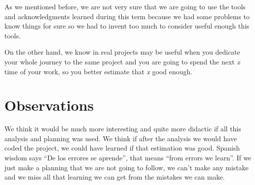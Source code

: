 \documentclass{report}
\begin{document}
As we mentioned before, we are not very sure that we are going to use the tools and acknowledgments learned during this term because we had some problems to know things for sure so we had to invent too much to consider useful enough this tools.

On the other hand, we know in real projects may be useful when you dedicate your whole journey to the same project and you are going to spend the next \emph{x} time of your work, so you better estimate that \emph{x} good enough.

\section{Observations}

We think it would be much more interesting and quite more didactic if all this analysis and planning was used. We think if after the analysis we would have coded the project, we could have learned if that estimation was good. Spanish wisdom says ``De los errores se aprende'', that means ``from errors we learn''. If we just make a planning that we are not going to follow, we can't make any mistake and we miss all that learning we can get from the mistakes we can make.
\end{document}

